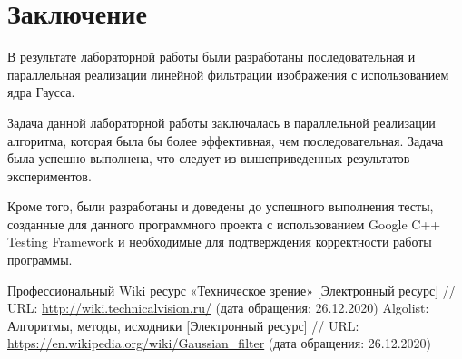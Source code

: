 \documentclass{report}
\begin{document}
\section*{Заключение}
В результате лабораторной работы были разработаны последовательная и параллельная реализации линейной фильтрации изображения с использованием ядра Гаусса.
\par Задача данной лабораторной работы заключалась в параллельной реализации алгоритма, которая была бы более эффективная, чем последовательная. Задача была успешно выполнена, что следует из вышеприведенных результатов экспериментов.
\par Кроме того, были разработаны и доведены до успешного выполнения тесты, созданные для данного программного проекта с использованием Google C++ Testing Framework и необходимые для подтверждения корректности работы программы.
\newpage

\begin{thebibliography}{1}
 Профессиональный Wiki ресурс «Техническое зрение» [Электронный ресурс] // URL: \url {http://wiki.technicalvision.ru/} (дата обращения: 26.12.2020)
 Algolist: Алгоритмы, методы, исходники [Электронный ресурс] // URL: \url {https://en.wikipedia.org/wiki/Gaussian_filter} (дата обращения: 26.12.2020)
\end{thebibliography}
\newpage

\end{document}
